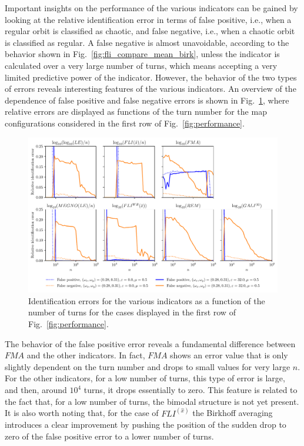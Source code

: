 Important insights on the performance of the various indicators can be gained by looking at the relative identification error in terms of false positive, i.e., when a regular orbit is classified as chaotic, and false negative, i.e., when a chaotic orbit is classified as regular. A false negative is almost unavoidable, according to the behavior shown in Fig.~\ref{fig:fli_compare_mean_birk}, unless the indicator is calculated over a very large number of turns, which means accepting a very limited predictive power of the indicator. However, the behavior of the two types of errors reveals interesting features of the various indicators. An overview of the dependence of false positive and false negative errors is shown in Fig.~\ref{fig:error_comparison}, where relative errors are displayed as functions of the turn number for the map configurations considered in the first row of Fig.~\ref{fig:performance}. 
%
\begin{figure}[htp]
    \centering
    \includegraphics[width=\textwidth]{6_dynamic_indicators/fig/corrected_figs/performance_specific_1_3.pdf}
    \caption{Identification errors for the various indicators as a function of the number of turns for the cases displayed in the first row of Fig.~\ref{fig:performance}.}
    \label{fig:error_comparison}
\end{figure}
%

The behavior of the false positive error reveals a fundamental difference between $FMA$ and the other indicators. In fact, $FMA$ shows an error value that is only slightly dependent on the turn number and drops to small values for very large $n$. For the other indicators, for a low number of turns, this type of error is large, and then, around $10^4$ turns, it drops essentially to zero. This feature is related to the fact that, for a low number of turns, the bimodal structure is not yet present. It is also worth noting that, for the case of $FLI^(\hat{{x}})$ the Birkhoff averaging introduces a clear improvement by pushing the position of the sudden drop to zero of the false positive error to a lower number of turns.

